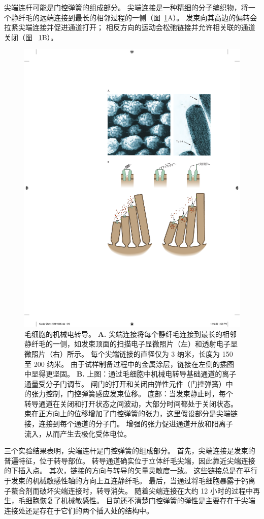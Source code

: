 尖端连杆可能是门控弹簧的组成部分。
尖端连接是一种精细的分子编织物，将一个静纤毛的远端连接到最长的相邻过程的一侧（图~\ref{fig:26_8}A）。
发束向其高边的偏转会拉紧尖端连接并促进通道打开； 相反方向的运动会松弛链接并允许相关联的通道关闭（图 ~\ref{fig:26_8}B）。


\begin{figure}[htbp]
	\centering
	\includegraphics[width=0.5\linewidth]{chap26/fig_26_8}
	\caption{毛细胞的机械电转导。
		\textbf{A.} 尖端连接将每个静纤毛连接到最长的相邻静纤毛的一侧，如发束顶面的扫描电子显微照片（左）和透射电子显微照片（右）所示。
		每个尖端链接的直径仅为 3 纳米，长度为 150 至 200 纳米。
		由于试样制备过程中的金属涂层，链接在左侧的插图中显得更坚固\cite{assad1991tip,hudspeth1994pulling}。
		\textbf{B.} 上图：通过毛细胞中机械电转导基础通道的离子通量受分子门调节。
		闸门的打开和关闭由弹性元件（门控弹簧）中的张力控制，门控弹簧感应发束位移\cite{howard1988compliance}。
		底部：当发束静止时，每个转导通道在关闭和打开状态之间波动，大部分时间都处于关闭状态。
		束在正方向上的位移增加了门控弹簧的张力，这里假设部分是尖端链接，连接到每个通道的分子门。
		增强的张力促进通道开放和阳离子流入，从而产生去极化受体电位\cite{hudspeth1989ear}。}
	\label{fig:26_8}
\end{figure}


三个实验结果表明，尖端连杆是门控弹簧的组成部分。
首先，尖端连接是发束的普遍特征，位于转导部位。
转导通道确实位于立体纤毛尖端，因此靠近尖端连接的下插入点。
其次，链接的方向与转导的矢量灵敏度一致。
这些链接总是在平行于发束的机械敏感性轴的方向上互连静纤毛。
最后，当通过将毛细胞暴露于钙离子螯合剂而破坏尖端连接时，转导消失。
随着尖端连接在大约 12 小时的过程中再生，毛细胞恢复了机械敏感性。
目前还不清楚门控弹簧的弹性是主要存在于尖端连接处还是存在于它们的两个插入处的结构中。


